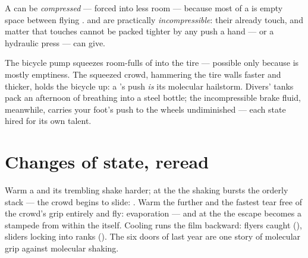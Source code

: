 \begin{proposition}\label{prop:g7:states-of-matter:squeeze}
A  can be \emph{compressed} --- forced into
less room --- because most of a  is empty space between flying
.  and  are practically
\emph{incompressible}: their  already touch, and matter
that touches cannot be packed tighter by any push a hand ---
or a hydraulic press --- can give.
\end{proposition}

\begin{example}\label{ex:g7:states-of-matter:squeezed}
The bicycle pump squeezes room-fulls of  into the tire ---
possible only because  is mostly emptiness. The squeezed
crowd,  hammering the tire walls faster and thicker,
holds the bicycle up: a 's push \emph{is} its molecular
hailstorm. Divers' tanks pack an afternoon of breathing into a
steel bottle; the incompressible brake fluid, meanwhile, carries
your foot's push to the wheels undiminished --- each state hired
for its own talent.
\end{example}

\section{Changes of state, reread}

\begin{example}\label{ex:g7:states-of-matter:doors}
Warm a  and its trembling  shake harder; at the
 the shaking bursts the orderly stack --- the crowd
begins to slide: . Warm the  further and the fastest
 tear free of the crowd's grip entirely and fly:
evaporation --- and at the  the escape becomes a
stampede from within the  itself. Cooling runs the film
backward: flyers caught (), sliders locking into
ranks (). The six doors of last year are one story
of molecular grip against molecular shaking.
\end{example}

